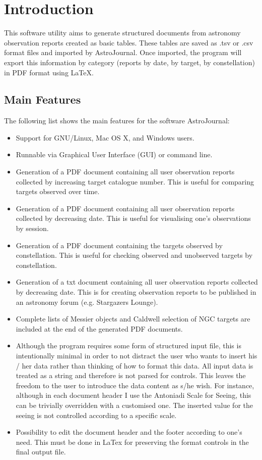 \section{Introduction}
\label{sec:Introduction}
This software utility aims to generate structured documents from astronomy observation reports created as basic tables. These tables are saved as .tsv or .csv format files and imported by AstroJournal. Once imported, the program will export this information by category (reports by date, by target, by constellation) in PDF format using LaTeX.


\subsection{Main Features}
\label{subsec:Main Features}
The following list shows the main features for the software AstroJournal:
\begin{itemize}
 \item Support for GNU/Linux, Mac OS X, and Windows users.
 \item Runnable via Graphical User Interface (GUI) or command line.
 \item Generation of a PDF document containing all user observation reports collected by increasing target catalogue number. This is useful for comparing targets observed over time.
 \item Generation of a PDF document containing all user observation reports collected by decreasing date. This is useful for visualising one's observations by session.
 \item Generation of a PDF document containing the targets observed by constellation. This is useful for checking observed and unobserved targets by constellation.
 \item Generation of a txt document containing all user observation reports collected by decreasing date. This is for creating observation reports to be published in an astronomy forum (e.g. Stargazers Lounge).
 \item Complete lists of Messier objects and Caldwell selection of NGC targets are included at the end of the generated PDF documents.
 \item Although the program requires some form of structured input file, this is intentionally minimal in order to not distract the user who wants to insert his / her data rather than thinking of how to format this data. All input data is treated as a string and therefore is not parsed for controls. This leaves the freedom to the user to introduce the data content as s/he wish. For instance, although in each document header I use the Antoniadi Scale for Seeing, this can be trivially overridden with a customised one. The inserted value for the seeing is not controlled according to a specific scale.
 \item Possibility to edit the document header and the footer according to one's need. This must be done in LaTex for preserving the format controls in the final output file.
\end{itemize}


